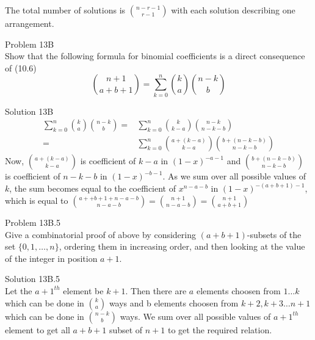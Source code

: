 \documentclass{tufte-book}
\begin{document}
The total number of solutions is $n-r-1\choose r-1$ with each solution describing one arrangement.
\begin{tcolorbox}[colback=red!5!white]
	\large{Problem 13B}\\
	Show that the following formula for binomial coefficients is a direct consequence of (10.6)
	$${n+1\choose a+b+1}=\sum_{k=0}^n{k\choose a}{n-k\choose b}$$
\end{tcolorbox}
\large{Solution 13B}
\begin{align*}
\sum_{k=0}^n{k\choose a}{n-k\choose b}=&\sum_{k=0}^n{k\choose k-a}{n-k\choose n-k-b}\\
=&\sum_{k=0}^n{a+(k-a)\choose k-a}{b+(n-k-b)\choose n-k-b}
\end{align*}
Now,  ${a+(k-a)\choose k-a}$ is coefficient of $k-a$ in $(1-x)^{-a-1}$ and ${b+(n-k-b)\choose n-k-b}$ is coefficient of $n-k-b$ in $(1-x)^{-b-1}$. As we sum over all possible values of $k$, the sum becomes equal to the coefficient of $x^{n-a-b}$ in $(1-x)^{-(a+b+1)-1}$, which is equal to ${a++b+1+n-a-b\choose n-a-b}={n+1\choose n-a-b}={n+1\choose a+b+1}$

\begin{tcolorbox}[colback=red!5!white]
	\large{Problem 13B.5}\\
	Give a combinatorial proof of above  by considering $(a + b + 1)$-subsets of
the set $\{0, 1,\hdots,n\}$, ordering them in increasing order, and then
looking at the value of the integer in position $a + 1$.
\end{tcolorbox}\noindent
\large{Solution 13B.5}\\
Let the $a+1^{th}$ element be $k+1$. Then there are $a$ elements choosen from $1\hdots k$ which can be done in ${k\choose a}$ ways and b elements choosen from $k+2,k+3\hdots n+1$ which can be done in ${n-k}\choose b$ ways. We sum over all possible values of $a+1^{th}$ element to get all $a+b+1$ subset of $n+1$ to get the required relation.
\end{document}
